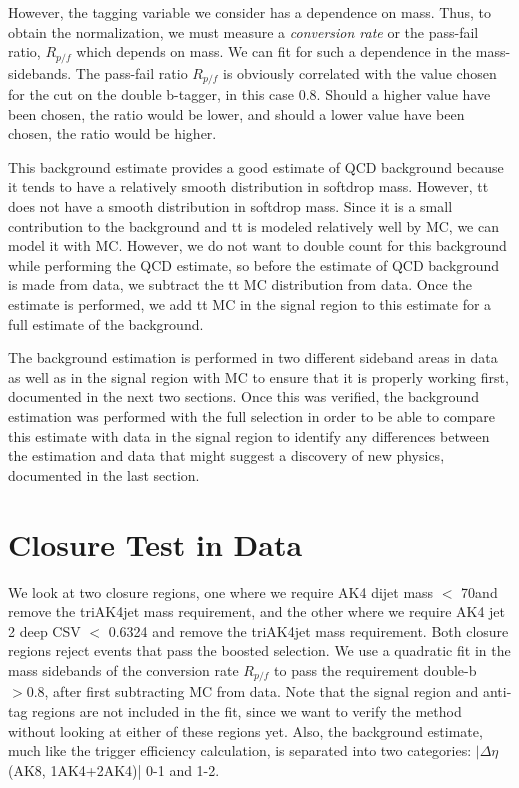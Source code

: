 However, the tagging variable we consider has a dependence on mass.
Thus, to obtain the normalization, we must measure a \textit{conversion rate} or the pass-fail ratio, $R_{p/f}$ which depends on mass. We can fit for such a dependence in the mass-sidebands. The pass-fail ratio $R_{p/f}$ is obviously correlated with the value chosen for the cut on the double b-tagger, in this case 0.8. Should a higher value have been chosen, the ratio would be lower, and should a lower value have been chosen, the ratio would be higher.

This background estimate provides a good estimate of QCD background because it tends to have a relatively smooth distribution in softdrop mass. However, tt does not have a smooth distribution in softdrop mass. Since it is a small contribution to the background and tt is modeled relatively well by MC, we can model it with MC. However, we do not want to double count for this background while performing the QCD estimate, so before the estimate of QCD background is made from data, we subtract the tt MC distribution from data. Once the estimate is performed, we add tt MC in the signal region to this estimate for a full estimate of the background.

The background estimation is performed in two different sideband areas in data as well as in the signal region with MC to ensure that it is properly working first, documented in the next two sections. Once this was verified, the background estimation was performed with the full selection in order to be able to compare this estimate with data in the signal region to identify any differences between the estimation and data that might suggest a discovery of new physics, documented in the last section.

\section{Closure Test in Data\label{ss:BkgValInData}}

We look at two closure regions, one where we require AK4 dijet mass $<$ 70\GeV and remove the triAK4jet mass requirement, and the other where we require AK4 jet 2 deep CSV $<$ 0.6324 and remove the triAK4jet mass requirement. Both closure regions reject events that pass the boosted selection. We use a quadratic fit in the mass sidebands of the conversion rate $R_{p/f}$ to pass the requirement double-b$ > 0.8$, after first subtracting \ttbar MC from data. Note that the signal region and anti-tag regions are not included in the fit, since we want to verify the method without looking at either of these regions yet. Also, the background estimate, much like the trigger efficiency calculation, is separated into two categories: $|\Delta\eta$(AK8, 1AK4+2AK4)| 0-1 and 1-2.

